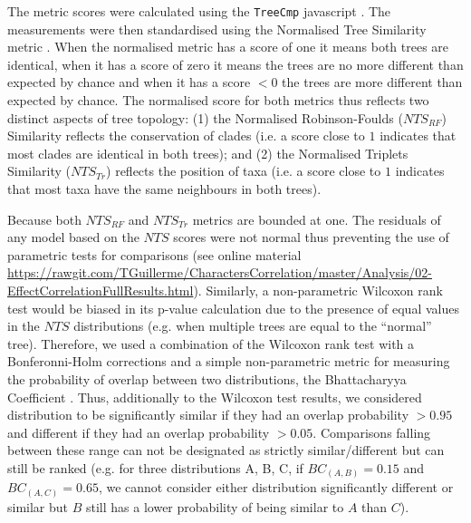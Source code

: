\documentclass[12pt,letterpaper]{article}
\begin{document}
The metric scores were calculated using the \texttt{TreeCmp} javascript \citep{Bogdanowicz2012}.
The measurements were then standardised using the Normalised Tree Similarity metric \citep[$NTS$; i.e. centering the metrics scores using the mean metric score for 1000 pairwise comparisons between random trees with $n$ taxa;][]{Bogdanowicz2012,Guillerme2016146}.
When the normalised metric has a score of one it means both trees are identical, when it has a score of zero it means the trees are no more different than expected by chance and when it has a score $<0$ the trees are more different than expected by chance.
The normalised score for both metrics thus reflects two distinct aspects of tree topology: (1) the Normalised Robinson-Foulds ($NTS_{RF}$) Similarity reflects the conservation of clades (i.e. a score close to $1$ indicates that most clades are identical in both trees); and (2) the Normalised Triplets Similarity ($NTS_{Tr}$) reflects the position of taxa (i.e. a score close to $1$ indicates that most taxa have the same neighbours in both trees).

Because both $NTS_{RF}$ and $NTS_{Tr}$ metrics are bounded at one.
The residuals of any model based on the $NTS$ scores were not normal thus preventing the use of parametric tests for comparisons (see online material \url{https://rawgit.com/TGuillerme/CharactersCorrelation/master/Analysis/02-EffectCorrelationFullResults.html}). 
Similarly, a non-parametric Wilcoxon rank test \citep{hollander2013nonparametric} would be biased in its p-value calculation due to the presence of equal values in the $NTS$ distributions (e.g. when multiple trees are equal to the ``normal'' tree).
Therefore, we used a combination of the Wilcoxon rank test with a Bonferonni-Holm corrections \citep[to ensure our significant results were robust to Type I error rate inflation;][]{holm1979simple} and a simple non-parametric metric for measuring the probability of overlap between two distributions, the Bhattacharyya Coefficient \citep[$BC$;][]{Bhattacharyya,Guillerme2016146,soto2016trace}.
Thus, additionally to the Wilcoxon test results, we considered distribution to be significantly similar if they had an overlap probability $>0.95$ and different if they had an overlap probability $>0.05$.
Comparisons falling between these range can not be designated as strictly similar/different but can still be ranked (e.g. for three distributions A, B, C, if $BC_{(A,B)} = 0.15$ and $BC_{(A,C)} = 0.65$, we cannot consider either distribution significantly different or similar but $B$ still has a lower probability of being similar to $A$ than $C$).
\end{document}
